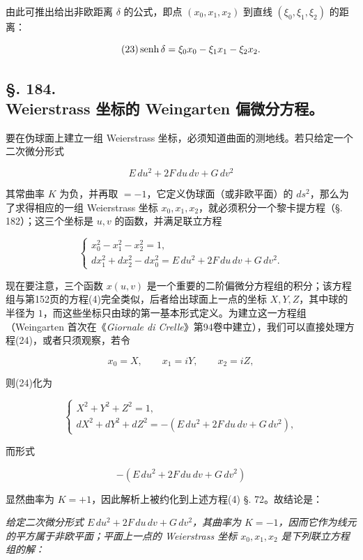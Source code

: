 由此可推出给出非欧距离 \(\delta\) 的公式，即点 \((x_0,x_1,x_2)\) 到直线 \((\xi_0,\xi_1,\xi_2)\) 的距离：

\[
\tag{23}
 \operatorname{senh}\delta=\xi_0x_0-\xi_1x_1-\xi_2x_2.
\]



\subsection*{§. 184.\\ Weierstrass 坐标的 Weingarten 偏微分方程。}



要在伪球面上建立一组 Weierstrass 坐标，必须知道曲面的测地线。若只给定一个二次微分形式

\[
 E\,du^2+2F\,du\,dv+G\,dv^2
\]

其常曲率 $K$ 为负，并再取 $=-1$，它定义伪球面（或非欧平面）的 $ds^2$，那么为了求得相应的一组 Weierstrass 坐标 $x_0,x_1,x_2$，就必须积分一个黎卡提方程（§. 182）；这三个坐标是 $u,v$ 的函数，并满足联立方程

\[
\tag{24}
\begin{cases}
 x_0^2-x_1^2-x_2^2=1,\\
 dx_1^2+dx_2^2-dx_0^2=E\,du^2+2F\,du\,dv+G\,dv^2.
\end{cases}
\]

现在要注意，三个函数 $x(u,v)$ 是一个重要的二阶偏微分方程组的积分；该方程组与第152页的方程(4)完全类似，后者给出球面上一点的坐标 $X,Y,Z$，其中球的半径为 $1$，而这些坐标只由球的第一基本形式定义。为建立这一方程组（Weingarten 首次在《\emph{Giornale di Crelle}》第94卷中建立），我们可以直接处理方程(24)，或者只须观察，若令

\[
 x_0=X,
 \qquad x_1=iY,
 \qquad x_2=iZ,
\]

则(24)化为

\[
\begin{cases}
 X^2+Y^2+Z^2=1,\\
 dX^2+dY^2+dZ^2=-(E\,du^2+2F\,du\,dv+G\,dv^2),
\end{cases}
\]

而形式

\[
 -(E\,du^2+2F\,du\,dv+G\,dv^2)
\]

显然曲率为 $K=+1$，因此解析上被约化到上述方程(4) §. 72。故结论是：



\emph{给定二次微分形式 $E\,du^2+2F\,du\,dv+G\,dv^2$，其曲率为 $K=-1$，因而它作为线元的平方属于非欧平面；平面上一点的 Weierstrass 坐标 $x_0,x_1,x_2$ 是下列联立方程组的解：}

